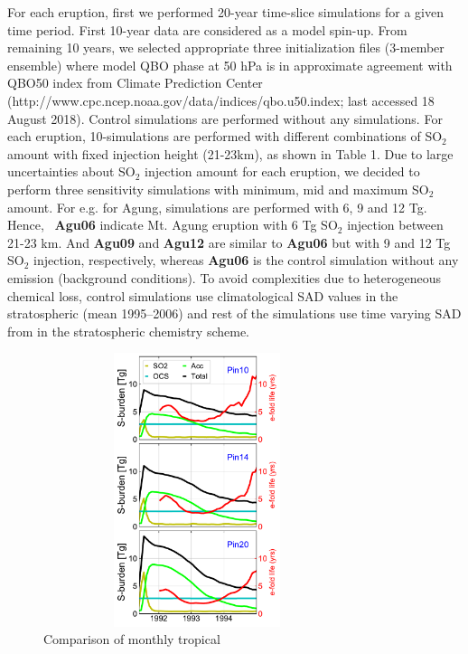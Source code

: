 \documentclass[acpd]{copernicus}
\newcommand\agub{{\bf Agu06}\xspace}
\newcommand\aguc{{\bf Agu09}\xspace}
\newcommand\agud{{\bf Agu12}\xspace}
\begin{document}
For each eruption, first we performed 20-year time-slice simulations for a given 
time period. First 10-year data are considered as a model spin-up.  From remaining 
10 years, we selected appropriate three initialization files (3-member ensemble)
 where model QBO phase at 50 hPa is in approximate agreement with QBO50 index from
 Climate Prediction Center (http://www.cpc.ncep.noaa.gov/data/indices/qbo.u50.index; 
last accessed 18 August 2018). Control simulations are performed without any simulations.
 For each eruption, 10-simulations are performed with different combinations of SO$_2$ amount
with fixed injection height (21-23km), as shown in Table 1.   
Due to large uncertainties about SO$_2$ injection amount for each eruption, we decided to 
perform three sensitivity simulations with minimum, mid and maximum SO$_2$ amount. For e.g. 
for Agung, simulations are performed with 6, 9 and 12 Tg. 
Hence, ~\agub indicate Mt. Agung eruption with 6 Tg SO$_2$ injection 
between 21-23 km. And \aguc and \agud  are similar to \agub but
 with 9 and 12 Tg SO$_2$ injection, respectively, whereas \agub is the
control simulation without any  emission (background conditions). 
To avoid complexities due to heterogeneous 
chemical loss, control simulations use climatological SAD values in the
stratospheric (mean 1995--2006) and rest of the simulations use time varying SAD from 
\cite{Arfeuille2013} in the stratospheric chemistry scheme. 



\newpage

\begin{figure}
\noindent
\includegraphics[width=9cm,height=8cm,angle=0]{Pin_burden.pdf}
\caption{Comparison    of   monthly        tropical}
\label{fig:satellite}
\end{figure}
\end{document}
